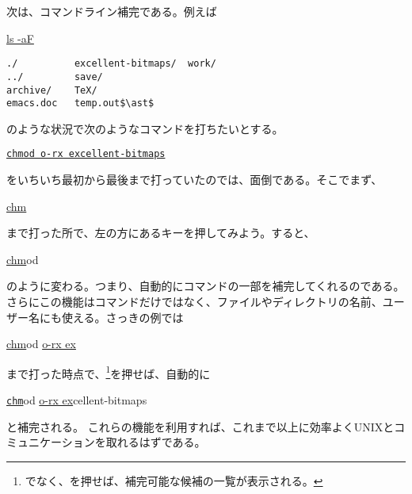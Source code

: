 次は、コマンドライン補完である。例えば
\begin{commandline2}
\prompt \underline{ls -aF}
\begin{verbatim}
./          excellent-bitmaps/  work/
../         save/
archive/    TeX/
emacs.doc   temp.out$\ast$
\end{verbatim}
\end{commandline2} \noindent
のような状況で次のようなコマンドを打ちたいとする。
\begin{commandline2}
\prompt \underline{\tt chmod o-rx excellent-bitmaps}
\end{commandline2} \noindent
をいちいち最初から最後まで打っていたのでは、面倒である。そこでまず、
\begin{commandline2}
\prompt \underline{chm}
\end{commandline2} \noindent
まで打った所で、左の方にあるキーを押してみよう。すると、
\begin{commandline2}
\prompt \underline{chm}od\ \cursor
\end{commandline2} \noindent
のように変わる。つまり、自動的にコマンドの一部を補完してくれるのである。さらにこの機能はコマンドだけではなく、ファイルやディレクトリの名前、ユーザー名にも使える。さっきの例では
\begin{commandline2}
\prompt \underline{chm}od \underline{o-rx ex}
\end{commandline2} \noindent
まで打った時点で、\footnote{でなく、を押せば、補完可能な候補の一覧が表示される。}を押せば、自動的に
\begin{commandline2}
\prompt \underline{\tt chm}od \underline{o-rx ex}cellent-bitmaps
\end{commandline2} \noindent
と補完される。%
これらの機能を利用すれば、これまで以上に効率よくUNIXとコミュニケーションを取れるはずである。


